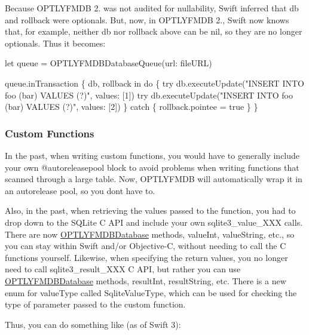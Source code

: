 Because O\+P\+T\+L\+Y\+F\+M\+DB 2. was not audited for nullability, Swift inferred that {\ttfamily db} and {\ttfamily rollback} were optionals. But, now, in O\+P\+T\+L\+Y\+F\+M\+DB 2., Swift now knows that, for example, neither {\ttfamily db} nor {\ttfamily rollback} above can be {\ttfamily nil}, so they are no longer optionals. Thus it becomes\+:


\begin{DoxyCode}
let queue = OPTLYFMDBDatabaseQueue(url: fileURL)

queue.inTransaction \{ db, rollback in
    do \{
        try db.executeUpdate("INSERT INTO foo (bar) VALUES (?)", values: [1])
        try db.executeUpdate("INSERT INTO foo (bar) VALUES (?)", values: [2])
    \} catch \{
        rollback.pointee = true
    \}
\}
\end{DoxyCode}


\subsubsection*{Custom Functions}

In the past, when writing custom functions, you would have to generally include your own {\ttfamily @autoreleasepool} block to avoid problems when writing functions that scanned through a large table. Now, O\+P\+T\+L\+Y\+F\+M\+DB will automatically wrap it in an autorelease pool, so you don\textquotesingle{}t have to.

Also, in the past, when retrieving the values passed to the function, you had to drop down to the S\+Q\+Lite C A\+PI and include your own {\ttfamily sqlite3\+\_\+value\+\_\+\+X\+XX} calls. There are now {\ttfamily \mbox{\hyperlink{interface_o_p_t_l_y_f_m_d_b_database}{O\+P\+T\+L\+Y\+F\+M\+D\+B\+Database}}} methods, {\ttfamily value\+Int}, {\ttfamily value\+String}, etc., so you can stay within Swift and/or Objective-\/C, without needing to call the C functions yourself. Likewise, when specifying the return values, you no longer need to call {\ttfamily sqlite3\+\_\+result\+\_\+\+X\+XX} C A\+PI, but rather you can use {\ttfamily \mbox{\hyperlink{interface_o_p_t_l_y_f_m_d_b_database}{O\+P\+T\+L\+Y\+F\+M\+D\+B\+Database}}} methods, {\ttfamily result\+Int}, {\ttfamily result\+String}, etc. There is a new {\ttfamily enum} for {\ttfamily value\+Type} called {\ttfamily Sqlite\+Value\+Type}, which can be used for checking the type of parameter passed to the custom function.

Thus, you can do something like (as of Swift 3)\+:


